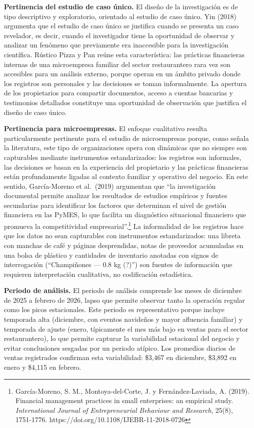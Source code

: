 \documentclass[
  12pt,
  spanish,
]{article}
\begin{document}
\textbf{Pertinencia del estudio de caso único.} El diseño de la
investigación es de tipo descriptivo y exploratorio, orientado al
estudio de caso único. Yin (2018) argumenta que el estudio de caso único
se justifica cuando se presenta un caso revelador, es decir, cuando el
investigador tiene la oportunidad de observar y analizar un fenómeno que
previamente era inaccesible para la investigación científica. Rústico
Pizza y Pan reúne esta característica: las prácticas financieras
internas de una microempresa familiar del sector restaurantero rara vez
son accesibles para un análisis externo, porque operan en un ámbito
privado donde los registros son personales y las decisiones se toman
informalmente. La apertura de los propietarios para compartir
documentos, acceso a cuentas bancarias y testimonios detallados
constituye una oportunidad de observación que justifica el diseño de
caso único.

\textbf{Pertinencia para microempresas.} El enfoque cualitativo resulta
particularmente pertinente para el estudio de microempresas porque, como
señala la literatura, este tipo de organizaciones opera con dinámicas
que no siempre son capturables mediante instrumentos estandarizados: los
registros son informales, las decisiones se basan en la experiencia del
propietario y las prácticas financieras están profundamente ligadas al
contexto familiar y operativo del negocio. En este sentido,
García-Moreno et al.~(2019) argumentan que ``la investigación documental
permite analizar los resultados de estudios empíricos y fuentes
secundarias para identificar los factores que determinan el nivel de
gestión financiera en las PyMES, lo que facilita un diagnóstico
situacional financiero que promueva la competitividad
empresarial''.\footnote{García-Moreno, S. M., Montoya-del-Corte, J. y
  Fernández-Laviada, A. (2019). Financial management practices in small
  enterprises: an empirical study. \emph{International Journal of
  Entrepreneurial Behaviour and Research}, 25(8), 1751-1776.
  https://doi.org/10.1108/IJEBR-11-2018-0726} La informalidad de los
registros hace que los datos no sean capturables con instrumentos
estandarizados: una libreta con manchas de café y páginas desprendidas,
notas de proveedor acumuladas en una bolsa de plástico y cantidades de
inventario anotadas con signos de interrogación (``Champiñones --- 0.8
kg (?)'') son fuentes de información que requieren interpretación
cualitativa, no codificación estadística.

\textbf{Periodo de análisis.} El periodo de análisis comprende los meses
de diciembre de 2025 a febrero de 2026, lapso que permite observar tanto
la operación regular como los picos estacionales. Este periodo es
representativo porque incluye temporada alta (diciembre, con eventos
navideños y mayor afluencia familiar) y temporada de ajuste (enero,
típicamente el mes más bajo en ventas para el sector restaurantero), lo
que permite capturar la variabilidad estacional del negocio y evitar
conclusiones sesgadas por un periodo atípico. Los promedios diarios de
ventas registrados confirman esta variabilidad: \$3,467 en diciembre,
\$3,892 en enero y \$4,115 en febrero.
\end{document}
